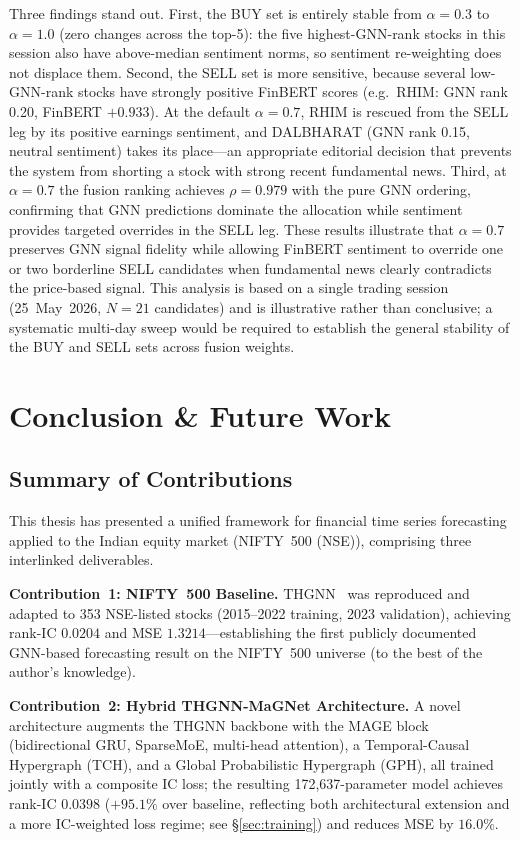 \documentclass[a4paper,11pt]{report}
\begin{document}
Three findings stand out. First, the BUY set is entirely stable from $\alpha=0.3$ to $\alpha=1.0$ (zero changes across the top-5): the five highest-GNN-rank stocks in this session also have above-median sentiment norms, so sentiment re-weighting does not displace them. Second, the SELL set is more sensitive, because several low-GNN-rank stocks have strongly positive FinBERT scores (e.g.\ RHIM: GNN rank 0.20, FinBERT $+0.933$). At the default $\alpha=0.7$, RHIM is rescued from the SELL leg by its positive earnings sentiment, and DALBHARAT (GNN rank 0.15, neutral sentiment) takes its place---an appropriate editorial decision that prevents the system from shorting a stock with strong recent fundamental news. Third, at $\alpha=0.7$ the fusion ranking achieves $\rho=0.979$ with the pure GNN ordering, confirming that GNN predictions dominate the allocation while sentiment provides targeted overrides in the SELL leg. These results illustrate that $\alpha=0.7$ preserves GNN signal fidelity while allowing FinBERT sentiment to override one or two borderline SELL candidates when fundamental news clearly contradicts the price-based signal. This analysis is based on a single trading session (25~May~2026, $N{=}21$ candidates) and is illustrative rather than conclusive; a systematic multi-day sweep would be required to establish the general stability of the BUY and SELL sets across fusion weights.

\chapter{Conclusion \& Future Work}
\label{ch:Conclusion}

\section{Summary of Contributions}

This thesis has presented a unified framework for financial time series forecasting applied to the Indian equity market (NIFTY~500 (NSE)), comprising three interlinked deliverables.

\textbf{Contribution~1: NIFTY~500 Baseline.} THGNN~\cite{xiang2022thgnn} was reproduced and adapted to 353 NSE-listed stocks (2015--2022 training, 2023 validation), achieving rank-IC $0.0204$ and MSE $1.3214$---establishing the first publicly documented GNN-based forecasting result on the NIFTY~500 universe (to the best of the author's knowledge).

\textbf{Contribution~2: Hybrid THGNN-MaGNet Architecture.} A novel architecture augments the THGNN backbone with the MAGE block (bidirectional GRU, SparseMoE, multi-head attention), a Temporal-Causal Hypergraph (TCH), and a Global Probabilistic Hypergraph (GPH), all trained jointly with a composite IC loss; the resulting 172,637-parameter model achieves rank-IC $0.0398$ ($+95.1\%$ over baseline, reflecting both architectural extension and a more IC-weighted loss regime; see §\ref{sec:training}) and reduces MSE by $16.0\%$.
\end{document}

